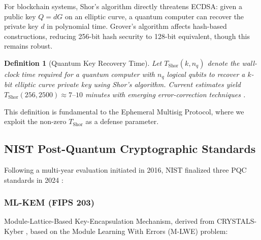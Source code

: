 \documentclass[12pt, a4paper, twocolumn]{article}
\newtheorem{definition}{Definition}
\begin{document}
For blockchain systems, Shor's algorithm directly threatens ECDSA: given a public key $Q = dG$ on an elliptic curve, a quantum computer can recover the private key $d$ in polynomial time. Grover's algorithm affects hash-based constructions, reducing 256-bit hash security to 128-bit equivalent, though this remains robust.

\begin{definition}[Quantum Key Recovery Time]
\label{def:tshor}
Let $T_{\text{Shor}}(k, n_q)$ denote the wall-clock time required for a quantum computer with $n_q$ logical qubits to recover a $k$-bit elliptic curve private key using Shor's algorithm. Current estimates yield $T_{\text{Shor}}(256, 2500) \approx 7\text{--}10$ minutes with emerging error-correction techniques \cite{gidney2021factor, roetteler2017quantum}.
\end{definition}

This definition is fundamental to the Ephemeral Multisig Protocol, where we exploit the non-zero $T_{\text{Shor}}$ as a defense parameter.

\subsection{NIST Post-Quantum Cryptographic Standards}

Following a multi-year evaluation initiated in 2016, NIST finalized three PQC standards in 2024 \cite{nist2024pqc}:

\subsubsection{ML-KEM (FIPS 203)}
Module-Lattice-Based Key-Encapsulation Mechanism, derived from CRYSTALS-Kyber \cite{bos2018crystals}, based on the Module Learning With Errors (M-LWE) problem:

\begin{table}[t]
\centering
{}
\caption{ML-KEM Parameter Sets}
\label{tab:mlkem}
\end{table}
\end{document}
